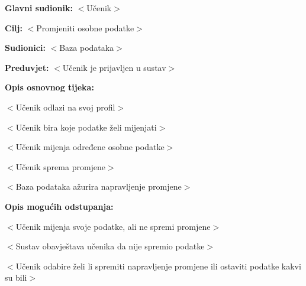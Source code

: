 					\noindent {}
					\begin{packed_item}
	
						\item \textbf{Glavni sudionik: }$<$Učenik$>$
						\item  \textbf{Cilj:} $<$Promjeniti osobne podatke$>$
						\item  \textbf{Sudionici:} $<$Baza podataka$>$
						\item  \textbf{Preduvjet:} $<$Učenik je prijavljen u sustav$>$
						\item  \textbf{Opis osnovnog tijeka:}
						
						\item[] \begin{packed_enum}
	
							\item $<$Učenik odlazi na svoj profil$>$
							\item $<$Učenik bira koje podatke želi mijenjati$>$
							\item $<$Učenik mijenja određene osobne podatke$>$
							\item $<$Učenik sprema promjene$>$
							\item $<$Baza podataka ažurira napravljenje promjene$>$
						\end{packed_enum}
						
						\item  \textbf{Opis mogućih odstupanja:}
						
						\item[] \begin{packed_item}
	
							\item[2.a] $<$Učenik mijenja svoje podatke, ali ne spremi promjene$>$
							\item[] \begin{packed_enum}
								
								\item $<$Sustav obavještava učenika da nije spremio podatke$>$
								\item $<$Učenik odabire želi li spremiti napravljenje promjene ili ostaviti podatke kakvi su bili$>$
								
							\end{packed_enum}
							
						\end{packed_item}
					\end{packed_item}

